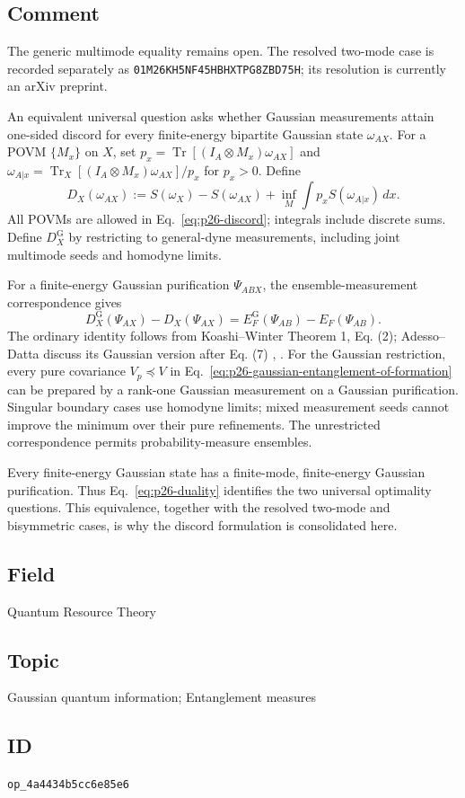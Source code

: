 \subsection*{Comment}

The generic multimode equality remains open. The resolved two-mode case is recorded separately as \texttt{01M26KH5NF45HBHXTPG8ZBD75H}; its resolution is currently an arXiv preprint.

An equivalent universal question asks whether Gaussian measurements attain one-sided discord for every finite-energy bipartite Gaussian state $\omega_{AX}$. For a POVM $\{M_x\}$ on $X$, set $p_x=\operatorname{Tr}[(I_A\otimes M_x)\omega_{AX}]$ and $\omega_{A|x}=\operatorname{Tr}_X[(I_A\otimes M_x)\omega_{AX}]/p_x$ for $p_x>0$. Define
\begin{equation}
D_X(\omega_{AX}):=S(\omega_X)-S(\omega_{AX})
+\inf_M\int p_x S(\omega_{A|x})\,dx .
\label{eq:p26-discord}
\end{equation}
All POVMs are allowed in Eq.~\eqref{eq:p26-discord}; integrals include discrete sums. Define $D_X^{\mathrm G}$ by restricting to general-dyne measurements, including joint multimode seeds and homodyne limits.

For a finite-energy Gaussian purification $\Psi_{ABX}$, the ensemble-measurement correspondence gives
\begin{equation}
D_X^{\mathrm G}(\Psi_{AX})-D_X(\Psi_{AX})
=E_F^{\mathrm G}(\Psi_{AB})-E_F(\Psi_{AB}).
\label{eq:p26-duality}
\end{equation}
The ordinary identity follows from Koashi--Winter Theorem 1, Eq. (2); Adesso--Datta discuss its Gaussian version after Eq. (7) , . For the Gaussian restriction, every pure covariance $V_p\preceq V$ in Eq.~\eqref{eq:p26-gaussian-entanglement-of-formation} can be prepared by a rank-one Gaussian measurement on a Gaussian purification. Singular boundary cases use homodyne limits; mixed measurement seeds cannot improve the minimum over their pure refinements. The unrestricted correspondence permits probability-measure ensembles.

Every finite-energy Gaussian state has a finite-mode, finite-energy Gaussian purification. Thus Eq.~\eqref{eq:p26-duality} identifies the two universal optimality questions. This equivalence, together with the resolved two-mode and bisymmetric cases, is why the discord formulation is consolidated here.

\subsection*{Field}

Quantum Resource Theory

\subsection*{Topic}

Gaussian quantum information; Entanglement measures

\subsection*{ID}

\texttt{op\_4a4434b5cc6e85e6}

